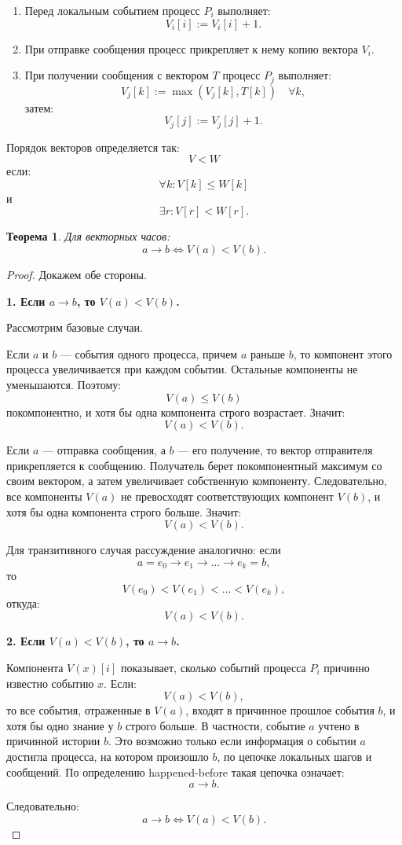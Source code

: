 \documentclass[12pt,a4paper]{article}
\newtheorem{theorem}{Теорема}
\begin{document}
\begin{enumerate}
    \item Перед локальным событием процесс $P_i$ выполняет:
    \[
    V_i[i] := V_i[i] + 1.
    \]
    \item При отправке сообщения процесс прикрепляет к нему копию вектора $V_i$.
    \item При получении сообщения с вектором $T$ процесс $P_j$ выполняет:
    \[
    V_j[k] := \max(V_j[k], T[k]) \quad \forall k,
    \]
    затем:
    \[
    V_j[j] := V_j[j] + 1.
    \]
\end{enumerate}

Порядок векторов определяется так:
\[
V < W
\]
если:
\[
\forall k: V[k] \leq W[k]
\]
и
\[
\exists r: V[r] < W[r].
\]

\begin{theorem}
Для векторных часов:
\[
a \rightarrow b \iff V(a) < V(b).
\]
\end{theorem}

\begin{proof}
Докажем обе стороны.

\textbf{1. Если $a \rightarrow b$, то $V(a) < V(b)$.}

Рассмотрим базовые случаи.

Если $a$ и $b$ --- события одного процесса, причем $a$ раньше $b$, то компонент этого процесса увеличивается при каждом событии. Остальные компоненты не уменьшаются. Поэтому:
\[
V(a) \leq V(b)
\]
покомпонентно, и хотя бы одна компонента строго возрастает. Значит:
\[
V(a) < V(b).
\]

Если $a$ --- отправка сообщения, а $b$ --- его получение, то вектор отправителя прикрепляется к сообщению. Получатель берет покомпонентный максимум со своим вектором, а затем увеличивает собственную компоненту. Следовательно, все компоненты $V(a)$ не превосходят соответствующих компонент $V(b)$, и хотя бы одна компонента строго больше. Значит:
\[
V(a) < V(b).
\]

Для транзитивного случая рассуждение аналогично: если
\[
a = e_0 \rightarrow e_1 \rightarrow \dots \rightarrow e_k = b,
\]
то
\[
V(e_0) < V(e_1) < \dots < V(e_k),
\]
откуда:
\[
V(a) < V(b).
\]

\textbf{2. Если $V(a) < V(b)$, то $a \rightarrow b$.}

Компонента $V(x)[i]$ показывает, сколько событий процесса $P_i$ причинно известно событию $x$. Если:
\[
V(a) < V(b),
\]
то все события, отраженные в $V(a)$, входят в причинное прошлое события $b$, и хотя бы одно знание у $b$ строго больше. В частности, событие $a$ учтено в причинной истории $b$. Это возможно только если информация о событии $a$ достигла процесса, на котором произошло $b$, по цепочке локальных шагов и сообщений. По определению happened-before такая цепочка означает:
\[
a \rightarrow b.
\]

Следовательно:
\[
a \rightarrow b \iff V(a) < V(b).
\]
\end{proof}
\end{document}
